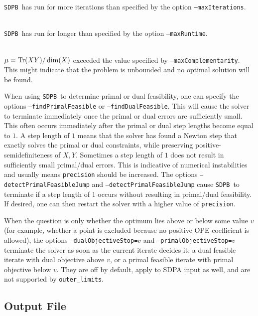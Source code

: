 \documentclass[12pt]{article}
\numberwithin{equation}{section}
\newcommand\SDPB{\texttt{SDPB}}
\begin{document}
\begin{description}
\SDPB\ has run for more iterations than specified by the option \texttt{--maxIterations}.
\item[\texttt{maxRuntime exceeded}] \hfill\\
\SDPB\ has run for longer than specified by the option \texttt{--maxRuntime}.
\item[\texttt{maxComplementarity exceeded}] \hfill\\
$\mu=\mathrm{Tr}(XY)/\dim(X)$ exceeded the value specified by \texttt{--maxComplementarity}.  This might indicate that the problem is unbounded and no optimal solution will be found.
\end{description}

When using \SDPB\ to determine primal or dual feasibility, one can specify the options \texttt{--findPrimalFeasible} or \texttt{--findDualFeasible}.  This will cause the solver to terminate immediately once the primal or dual errors are sufficiently small.  This often occurs immediately after the primal or dual step lengths become equal to $1$.  A step length of $1$ means that the solver has found a Newton step that exactly solves the primal or dual constraints, while preserving positive-semidefiniteness of $X,Y$.  Sometimes a step length of $1$ does not result in sufficiently small primal/dual errors.  This is indicative of numerical instabilities and usually means \texttt{precision} should be increased.  The options \texttt{--detectPrimalFeasibleJump} and \texttt{--detectPrimalFeasibleJump} cause \SDPB\ to terminate if a step length of 1 occurs without resulting in primal/dual feasibility.  If desired, one can then restart the solver with a higher value of \texttt{precision}.

When the question is only whether the optimum lies above or below some value $v$ (for example, whether a point is excluded because no positive OPE coefficient is allowed), the options \texttt{--dualObjectiveStop=$v$} and \texttt{--primalObjectiveStop=$v$} terminate the solver as soon as the current iterate decides it: a dual feasible iterate with dual objective above $v$, or a primal feasible iterate with primal objective below $v$.  They are off by default, apply to SDPA input as well, and are not supported by \texttt{outer\_limits}.


\subsection{Output File}
\label{sec:output-file}
\end{document}
